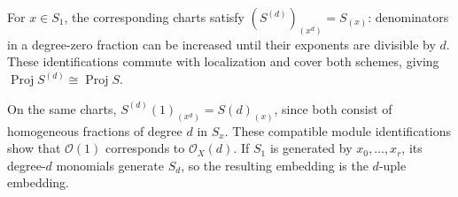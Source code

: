 For $x\in S_1$, the corresponding charts satisfy $(S^{(d)})_{(x^d)}=S_{(x)}$: denominators in a degree-zero fraction can be increased until their exponents are divisible by $d$. These identifications commute with localization and cover both schemes, giving $\operatorname{Proj}S^{(d)}\cong\operatorname{Proj}S$.

On the same charts, $S^{(d)}(1)_{(x^d)}=S(d)_{(x)}$, since both consist of homogeneous fractions of degree $d$ in $S_x$. These compatible module identifications show that $\mathcal O(1)$ corresponds to $\mathcal O_X(d)$. If $S_1$ is generated by $x_0,\ldots,x_r$, its degree-$d$ monomials generate $S_d$, so the resulting embedding is the $d$-uple embedding.
